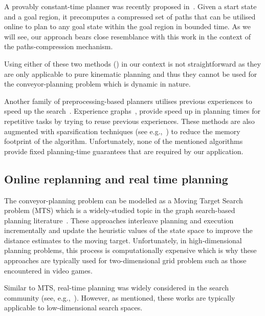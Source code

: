 \documentclass[conference]{IEEEtran}
\begin{document}
A provably constant-time planner was recently proposed in~\cite{islam2019planning}. Given a start state and a goal region, it precomputes a compressed set of paths that can be utilised online to plan to any goal state within the goal region in bounded time. As we will see, our approach bears close resemblance with this work in the context of the paths-compression mechanism.
%

Using either of these two methods (\cite{islam2019planning,kavraki1996probabilistic}) in our context is not straightforward as they are only applicable to pure kinematic planning and thus they cannot be used for the conveyor-planning problem which is dynamic in nature.
%

Another family of preprocessing-based planners utilises previous experiences to speed up the search~\cite{BAG12,CSMOC15,PCCL12}. Experience graphs~\cite{PCCL12}, provide speed up in planning times for repetitive tasks by trying to reuse previous experiences. These methods are also augmented with sparsification techniques (see e.g.,~\cite{DB14,SSAH14}) to reduce the memory footprint of the algorithm.
Unfortunately, none of the mentioned algorithms provide fixed planning-time guarantees that are required by our application.

\subsection{Online replanning and real time planning}
The conveyor-planning problem can be modelled as a Moving Target Search problem (MTS) which is a widely-studied topic in the graph search-based planning literature~\cite{ishida1991moving,ishida1995moving,koenig2007speeding,sun2010moving}. 
These approaches interleave planning and execution incrementally and update the heuristic values of the state space to improve the distance estimates to the moving target. Unfortunately, in high-dimensional planning problems, this process is computationally expensive which is why these approaches are typically used for two-dimensional grid problem such as those encountered in video games.

Similar to MTS, real-time planning was widely considered in the search community (see, e.g.,~\cite{KL06,KS09,korf1990real}).
However, as mentioned, these works are typically applicable to low-dimensional search spaces.
%
\end{document}
